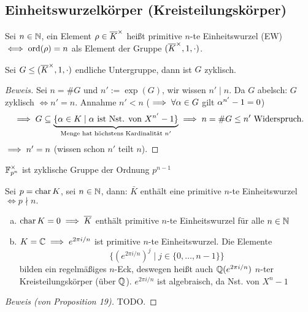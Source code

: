 \documentclass[a4paper]{report}
\begin{document}
\subsection{Einheitswurzelkörper (Kreisteilungskörper)}
\begin{defi}
  Sei $n \in \mathbb{N}$, ein Element $\rho \in \overline K^\times$ heißt primitive $n$-te Einheitswurzel (EW) $\iff \operatorname{ord}(\rho) = n$ als Element der Gruppe $(\overline K^\times, 1, \cdot)$.
\end{defi}
\begin{lemm}
  Sei $G \le (\overline K^\times, 1, \cdot)$ endliche Untergruppe, dann ist $G$ zyklisch.
  \begin{proof}[Beweis]
    Sei $n = \#G$ und $n' := \exp(G)$, wir wissen $n' \mid n$. Da $G$ abelsch: $G$ zyklisch $\iff n' = n$. Annahme $n' < n$ ($\implies \forall \alpha \in G$ gilt $\alpha^{n'} - 1 = 0$)
    \[\implies G \subseteq \underbrace{\{\alpha \in K \mid \alpha \text{ ist Nst. von }X^{n'} - 1\}}_{\text{Menge hat höchstens Kardinalität }n'} \implies n = \#G \le n' \text{ Widerspruch.}\]
    $\implies n' = n$ (wissen schon $n'$ teilt $n$).
  \end{proof}
\end{lemm}
\begin{bsp*}
$\mathbb{F}_{p^{n}}^\times$ ist zyklische Gruppe der Ordnung $p^{n-1}$
\end{bsp*}
\begin{prop}
Sei $p = \operatorname{char} K$, sei $n \in \mathbb{N}$, dann: $\bar K$ enthält eine primitive $n$-te Einheitswurzel $\iff p \nmid n.$
\end{prop}
\begin{bsp*}\item
\begin{enumerate}[(a)]
  \item $\operatorname{char} K = 0 \implies \overline K$ enthält primitive $n$-te Einheitswurzel für alle $n \in \mathbb{N}$
  \item $K = \mathbb{C} \implies e^{2\pi i/n}$ ist primitive $n$-te Einheitswurzel. Die Elemente  \[\{(e^{2\pi i/n})^{j} \mid j \in \{0, \ldots, n-1\}\}\]
  bilden ein regelmäßiges $n$-Eck, deswegen heißt auch $\mathbb{Q}(e^{2\pi i/n})$ $n$-ter Kreisteilungskörper (über $\mathbb{Q}$). $e^{2\pi i/n}$ ist algebraisch, da Nst. von $X^{n} - 1$
\end{enumerate}
\end{bsp*}

\begin{proof}[Beweis (von Proposition 19)]
  TODO.
\end{proof}
\end{document}
